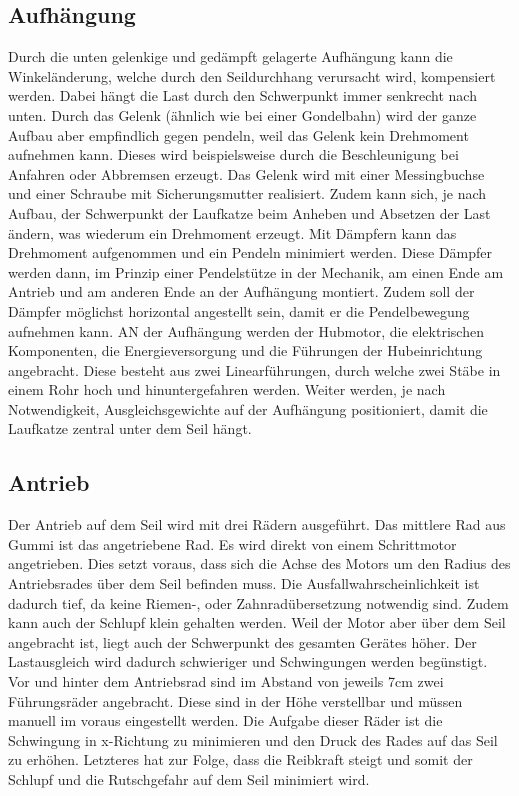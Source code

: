 \documentclass[a4paper]{report}
\begin{document}
\subsection{Aufhängung}
Durch die unten gelenkige und gedämpft gelagerte Aufhängung kann die Winkeländerung, welche durch den Seildurchhang verursacht wird, kompensiert werden. Dabei hängt die Last durch den Schwerpunkt immer senkrecht nach unten. Durch das Gelenk (ähnlich wie bei einer Gondelbahn) wird der ganze Aufbau aber empfindlich gegen pendeln, weil das Gelenk kein Drehmoment aufnehmen kann. Dieses wird beispielsweise durch die Beschleunigung bei Anfahren oder Abbremsen erzeugt. Das Gelenk wird mit einer Messingbuchse und einer Schraube mit Sicherungsmutter realisiert. Zudem kann sich, je nach Aufbau, der Schwerpunkt der Laufkatze beim Anheben und Absetzen der Last ändern, was wiederum ein Drehmoment erzeugt. Mit Dämpfern kann das Drehmoment aufgenommen und ein Pendeln minimiert werden. Diese Dämpfer werden dann, im Prinzip einer Pendelstütze in der Mechanik, am einen Ende am Antrieb und am anderen Ende an der Aufhängung montiert. Zudem soll der Dämpfer möglichst horizontal angestellt sein, damit er die Pendelbewegung aufnehmen kann. AN der Aufhängung werden der Hubmotor, die elektrischen Komponenten, die Energieversorgung und die Führungen der Hubeinrichtung angebracht. Diese besteht aus zwei Linearführungen, durch welche zwei Stäbe in einem Rohr hoch und hinuntergefahren werden. Weiter werden, je nach Notwendigkeit, Ausgleichsgewichte auf der Aufhängung positioniert, damit die Laufkatze zentral unter dem Seil hängt.

\subsection{Antrieb}
Der Antrieb auf dem Seil wird mit drei Rädern ausgeführt. Das mittlere Rad aus Gummi ist das angetriebene Rad. Es wird direkt von einem Schrittmotor angetrieben. Dies setzt voraus, dass sich die Achse des Motors um den Radius des Antriebsrades über dem Seil befinden muss. Die Ausfallwahrscheinlichkeit ist dadurch tief, da keine Riemen-, oder Zahnradübersetzung notwendig sind. Zudem kann auch der Schlupf klein gehalten werden. Weil der Motor aber über dem Seil angebracht ist, liegt auch der Schwerpunkt des gesamten Gerätes höher. Der Lastausgleich wird dadurch schwieriger und Schwingungen werden begünstigt.
\\
Vor und hinter dem Antriebsrad sind im Abstand von jeweils 7cm zwei Führungsräder angebracht. Diese sind in der Höhe verstellbar und müssen manuell im voraus eingestellt werden. Die Aufgabe dieser Räder ist die Schwingung in x-Richtung zu minimieren und den Druck des Rades auf das Seil zu erhöhen. Letzteres hat zur Folge, dass die Reibkraft steigt und somit der Schlupf und die Rutschgefahr auf dem Seil minimiert wird.
\end{document}
